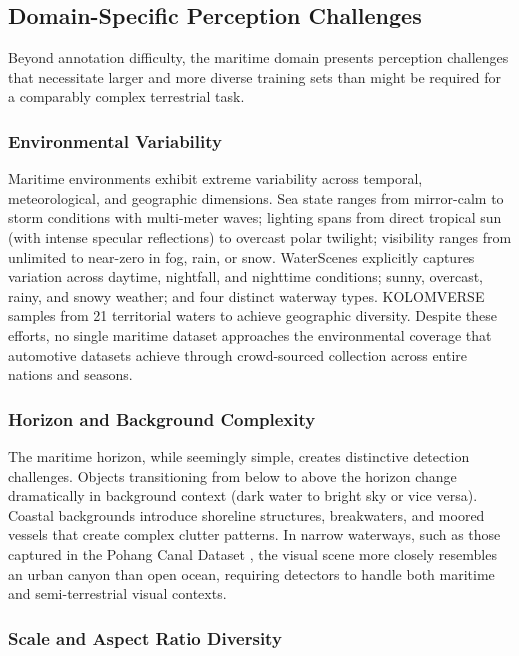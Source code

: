 \subsection{Domain-Specific Perception Challenges}
\label{subsec:domain_challenges}

Beyond annotation difficulty, the maritime domain presents perception challenges that
necessitate larger and more diverse training sets than might be required for a
comparably complex terrestrial task.

\subsubsection{Environmental Variability}

Maritime environments exhibit extreme variability across temporal, meteorological, and
geographic dimensions. Sea state ranges from mirror-calm to storm conditions with
multi-meter waves; lighting spans from direct tropical sun (with intense specular
reflections) to overcast polar twilight; visibility ranges from unlimited to near-zero
in fog, rain, or snow. WaterScenes \cite{Zhang2024WaterScenes} explicitly captures
variation across daytime, nightfall, and nighttime conditions; sunny, overcast, rainy,
and snowy weather; and four distinct waterway types. KOLOMVERSE
\cite{Nanda2024KOLOMVERSE} samples from 21 territorial waters to achieve geographic
diversity. Despite these efforts, no single maritime dataset approaches the
environmental coverage that automotive datasets achieve through crowd-sourced
collection across entire nations and seasons.

\subsubsection{Horizon and Background Complexity}

The maritime horizon, while seemingly simple, creates distinctive detection challenges.
Objects transitioning from below to above the horizon change dramatically in
background context (dark water to bright sky or vice versa). Coastal backgrounds
introduce shoreline structures, breakwaters, and moored vessels that create complex
clutter patterns. In narrow waterways, such as those captured in the Pohang Canal
Dataset \cite{Chung2023Pohang}, the visual scene more closely resembles an urban
canyon than open ocean, requiring detectors to handle both maritime and semi-terrestrial
visual contexts.

\subsubsection{Scale and Aspect Ratio Diversity}

